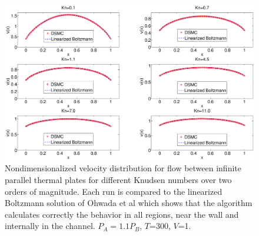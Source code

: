 \begin{figure}[h]
\includegraphics[width=\textwidth, trim=6cm 0cm 5cm 0cm, clip]{DSMC/figures/validation_poiseuille.eps}
\centering
\caption{Nondimensionalized velocity distribution for flow between infinite parallel thermal plates for different Knudsen numbers over two orders of magnitude. Each run is compared to the linearized Boltzmann solution of Ohwada et al\cite{ohwada1989numerical} which shows that the algorithm calculates correctly the behavior in all regions, near the wall and internally in the channel. $P_A = 1.1P_B$, $T$=\unit{300}{\kelvin}, $V$=\unit{1}{\micro\meter\cubed}.}
\label{fig:dsmc_validation_poiseuille}
\end{figure}